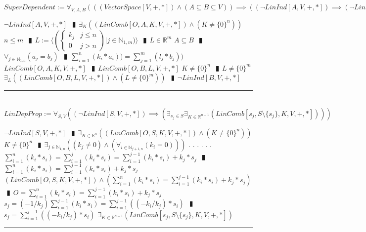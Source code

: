 \documentclass{book}
\newcommand{\abr}{:=}
\newcommand{\cont}{\phantom{.}. . .\phantom{.}}
\newcommand{\pipe}{$\phantom{(}\vrectangleblack\phantom{)}$}
\begin{document}
$SuperDependent \abr \forall_{V, A, B}(((VectorSpace[V, +, *]) \land (A \subseteq B \subseteq V)) \implies ((\lnot LinInd[A, V, +, *]) \implies (\lnot LinInd[B, V, +, *])))$
\begin{enumerate}
  \lit $\lnot LinInd[A, V, +, *]$ \pipe $\exists_{K}((LinComb[O, A, K, V, +, *]) \land (K \neq \{0\}^n))$
  \lit $n \leq m$ \pipe $L \abr \langle \left(\begin{cases} 
      k_j & j \leq n \\
      0 & j > n 
    \end{cases}\right) | j \in \mathbb{N}_{1, m}) \rangle$ \pipe $L \in \mathbb{R}^m$
  \lit $A \subseteq B$ \pipe $\forall_{j \in \mathbb{N}_{1, n}}(a_j = b_j)$ \pipe $\sum_{i = 1}^{n}(k_i * a_i)) = \sum_{j = 1}^{m}(l_j * b_j))$
  \lit $LinComb[O, A, K, V, +, *]$ \pipe $LinComb[O, B, L, V, +, *]$
  \lit $K \neq \{0\}^n$ \pipe $L \neq \{0\}^m$
  \lit $\exists_{L}((LinComb[O, B, L, V, +, *]) \land (L \neq \{0\}^m))$ \pipe $\lnot LinInd[B, V, +, *]$
\end{enumerate} \vspace{.75mm} \hrule \vspace{.75mm} \ \\ 

$LinDepProp \abr \forall_{S, V}((\lnot LinInd[S, V, +, *]) \implies (\exists_{s_j \in S} \exists_{K \in \mathbb{R}^{n - 1}}(LinComb[s_j, S \setminus \{s_j\}, K, V, +, *])))$
\begin{enumerate}
  \lit $\lnot LinInd[S, V, +, *]$ \pipe $\exists_{K \in \mathbb{R}^n}((LinComb[O, S, K, V, +, *]) \land (K \neq \{0\}^n))$
  \lit $K \neq \{0\}^n$ \pipe $\exists_{j \in \mathbb{N}_{1, n}}((k_j \neq 0) \land (\forall_{i \in \mathbb{N}_{j + 1, n}}(k_i = 0)))$ \cont
  \lit \cont $\sum_{i = 1}^{n}(k_i * s_i) = \sum_{i = 1}^{j}(k_i * s_i) = \sum_{i = 1}^{j - 1}(k_i * s_i) + k_j * s_j$ \pipe $\sum_{i = 1}^{n}(k_i * s_i) = \sum_{i = 1}^{j - 1}(k_i * s_i) + k_j * s_j$
  \lit $(LinComb[O, S, K, V, +, *]) \land (\sum_{i = 1}^{n}(k_i * s_i) = \sum_{i = 1}^{j - 1}(k_i * s_i) + k_j * s_j)$ \pipe $O = \sum_{i = 1}^{n}(k_i * s_i) = \sum_{i = 1}^{j - 1}(k_i * s_i) + k_j * s_j$
  \lit $s_j = (-1/k_j) \sum_{i = 1}^{j - 1}(k_i * s_i) = \sum_{i = 1}^{j - 1}((-k_i / k_j) * s_i)$ \pipe $s_j = \sum_{i = 1}^{j - 1}((-k_i / k_j) * s_i)$
  \lit $\exists_{K \in \mathbb{R}^{n - 1}}(LinComb[s_j, S \setminus \{s_j\}, K, V, +, *])$
\end{enumerate} \vspace{.75mm} \hrule \vspace{.75mm} \ \\ 
\end{document}

